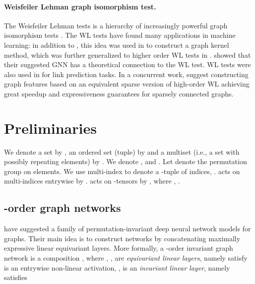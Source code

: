 \documentclass{article}
\newcommand{\ie}{{i.e.}}
\begin{document}
\paragraph{Weisfeiler Lehman graph isomorphism test.} The Weisfeiler Lehman tests is a hierarchy of increasingly powerful graph isomorphism tests \citep{grohe2017descriptive}. 
The WL tests have found many applications in machine learning: in addition to \cite{xu2018how,morris2018weisfeiler}, this idea was used in \cite{shervashidze2011weisfeiler} to construct a graph kernel method, which was further generalized to higher order WL tests in \cite{morris2017glocalized}. \citet{lei2017deriving} showed that their suggested GNN has a theoretical connection to the WL test. WL tests were also used in \cite{zhang2017weisfeiler} for link prediction tasks. In a concurrent work, \citet{morris2019towards} suggest constructing graph features based on an equivalent sparse version of high-order WL achieving great speedup and expressiveness guarantees for sparsely connected graphs. \vspace{-5pt}







\section{Preliminaries}\label{s:prelim}\vspace{-5pt}
We denote a set by , an ordered set (tuple) by  and a multiset (\ie, a set with possibly repeating elements) by . We denote , and . Let  denote the permutation group on  elements. 
We use multi-index  to denote a -tuple of indices, .  acts on multi-indices  entrywise by . 
 acts on -tensors  by , where , . 



\vspace{-5pt}
\subsection{-order graph networks}\label{ss:k_order_networks}
\vspace{-5pt}
\citet{maron2018invariant} have suggested a family of permutation-invariant deep neural network models for graphs. Their main idea is to construct networks by concatenating maximally expressive linear equivariant layers. More formally, a -order invariant graph network is a composition , where , , are \emph{equivariant linear layers}, namely satisfy 
 is an entrywise non-linear activation, ,  is an \emph{invariant linear layer}, namely satisfies 
\end{document}
